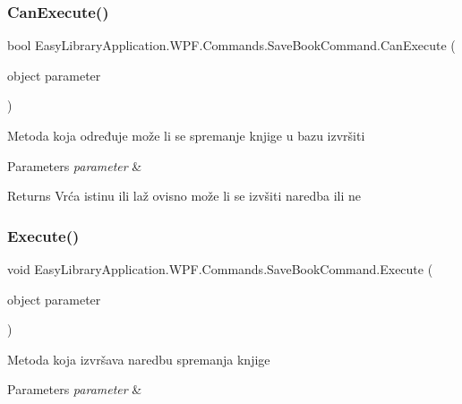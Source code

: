 \subsubsection{\texorpdfstring{Can\+Execute()}{CanExecute()}}
{\footnotesize\ttfamily bool Easy\+Library\+Application.\+W\+P\+F.\+Commands.\+Save\+Book\+Command.\+Can\+Execute (\begin{DoxyParamCaption}\item[{object}]{parameter }\end{DoxyParamCaption})}



Metoda koja određuje može li se spremanje knjige u bazu izvršiti 


\begin{DoxyParams}{Parameters}
{\em parameter} & \\
\hline
\end{DoxyParams}
\begin{DoxyReturn}{Returns}
Vrća istinu ili laž ovisno može li se izvšiti naredba ili ne
\end{DoxyReturn}
\mbox{\label{class_easy_library_application_1_1_w_p_f_1_1_commands_1_1_save_book_command_afb07e46a8e432b025276d8adc29fd246}} 
\subsubsection{\texorpdfstring{Execute()}{Execute()}}
{\footnotesize\ttfamily void Easy\+Library\+Application.\+W\+P\+F.\+Commands.\+Save\+Book\+Command.\+Execute (\begin{DoxyParamCaption}\item[{object}]{parameter }\end{DoxyParamCaption})}



Metoda koja izvršava naredbu spremanja knjige 


\begin{DoxyParams}{Parameters}
{\em parameter} & \\
\hline
\end{DoxyParams}


